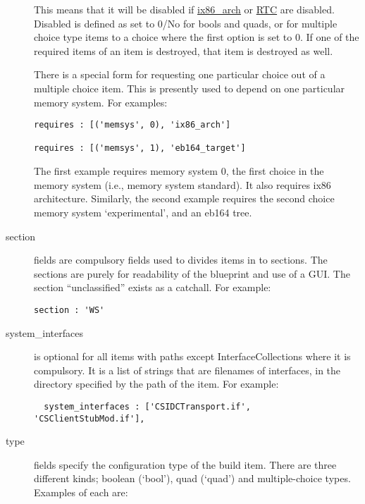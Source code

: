\documentclass[a4paper]{article}
\begin{document}
\begin{description}
This means that it will be disabled if \url{ix86_arch} or \url{RTC}
are disabled. Disabled is defined as set to 0/No for bools and
quads, or for multiple choice type items to a choice where the first
option is set to 0. If one of the required items of an item is
destroyed, that item is destroyed as well.

There is a special form for requesting one particular choice out of a
multiple choice item. This is presently used to depend on one
particular memory system. For examples:

\begin{verbatim}
requires : [('memsys', 0), 'ix86_arch']

requires : [('memsys', 1), 'eb164_target']
\end{verbatim}

The first example requires memory system 0, the first choice in the
memory system (i.e., memory system standard). It also requires ix86
architecture. Similarly, the second example requires the second choice
memory system `experimental', and an eb164 tree.

\item[section] fields are compulsory fields used to divides items in
to sections. The sections are purely for readability of the blueprint
and use of a GUI. The section ``unclassified'' exists as a
catchall. For example:

\begin{verbatim}
section : 'WS'
\end{verbatim}


\item[system\_interfaces] is optional for all items  with paths except
InterfaceCollections where it is compulsory. It is a list of strings
that are filenames of interfaces, in the directory specified by the
path of the item. For example:

\begin{verbatim}
  system_interfaces : ['CSIDCTransport.if', 'CSClientStubMod.if'],
\end{verbatim}



\item[type] fields specify the configuration type of the build
item. There are three different kinds; boolean (`bool'), quad
(`quad') and multiple-choice types. Examples of each are:


\end{description}
\end{document}
